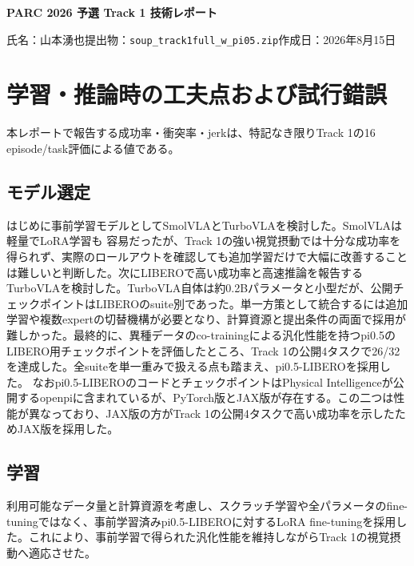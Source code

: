 \documentclass[10pt,a4paper]{article}
\newcommand{\code}[1]{\texttt{\small #1}}
\begin{document}
\begin{center}
  {\LARGE\bfseries PARC 2026 予選 Track 1 技術レポート}\par
  \vspace{0.35em}
  {\small 氏名：山本湧也\quad 提出物：\code{soup\_track1full\_w\_pi05.zip}\quad 作成日：2026年8月15日}
\end{center}

\section{学習・推論時の工夫点および試行錯誤}

本レポートで報告する成功率・衝突率・jerkは、特記なき限りTrack 1の16 episode/task評価による値である。

\subsection{モデル選定}

はじめに事前学習モデルとしてSmolVLAとTurboVLAを検討した。SmolVLAは軽量でLoRA学習も
容易だったが、Track 1の強い視覚摂動では十分な成功率を得られず、実際のロールアウトを確認しても追加学習だけで大幅に改善することは難しいと判断した\cite{smolvla}。次にLIBEROで高い成功率と高速推論を報告するTurboVLAを検討した\cite{turbovla}。TurboVLA自体は約0.2Bパラメータと小型だが、公開チェックポイントはLIBEROのsuite別であった。単一方策として統合するには追加学習や複数expertの切替機構が必要となり、計算資源と提出条件の両面で採用が難しかった。最終的に、異種データのco-trainingによる汎化性能を持つpi0.5\cite{pi05}のLIBERO用チェックポイントを評価したところ、Track 1の公開4タスクで26/32を達成した。全suiteを単一重みで扱える点も踏まえ、pi0.5-LIBEROを採用した。
なおpi0.5-LIBEROのコードとチェックポイントはPhysical Intelligenceが公開するopenpiに含まれているが、PyTorch版とJAX版が存在する。この二つは性能が異なっており、JAX版の方がTrack 1の公開4タスクで高い成功率を示したためJAX版を採用した\cite{openpi}。

\subsection{学習}

利用可能なデータ量と計算資源を考慮し、スクラッチ学習や全パラメータのfine-tuningではなく、事前学習済みpi0.5-LIBEROに対するLoRA fine-tuningを採用した。これにより、事前学習で得られた汎化性能を維持しながらTrack 1の視覚摂動へ適応させた。
\end{document}

